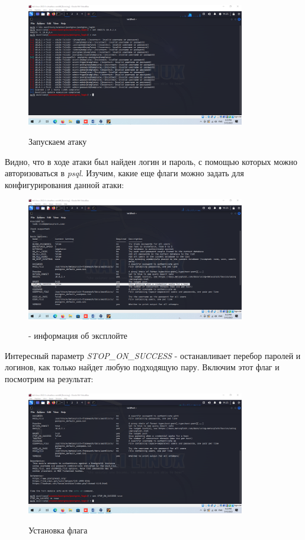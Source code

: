 \documentclass[a4paper]{article}
\begin{document}
  \begin{figure}[H]
    \centering
    \includegraphics[width=0.85\textwidth]{04_0051}
    \label{img:51}
    \caption{Запускаем атаку}
  \end{figure}

  Видно, что в ходе атаки был найден логин и пароль, с помощью которых можно авторизоваться
  в \textit{psql}. Изучим, какие еще флаги можно задать для конфигурирования данной атаки:

  \begin{figure}[H]
    \centering
    \includegraphics[width=0.85\textwidth]{04_0052}
    \label{img:52}
    \caption{ - информация об эксплойте}
  \end{figure}

  Интересный параметр \textit{STOP\_ON\_SUCCESS} - останавливает перебор паролей и логинов,
  как только найдет любую подходящую пару. Включим этот флаг и посмотрим на результат:

  \begin{figure}[H]
    \centering
    \includegraphics[width=0.85\textwidth]{04_0053}
    \label{img:53}
    \caption{Установка флага}
  \end{figure}
\end{document}
